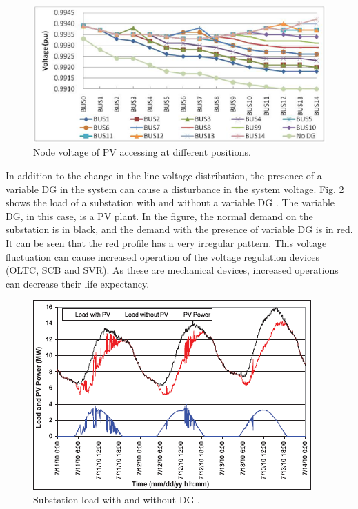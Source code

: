\begin{figure}[!h]
\centering
\includegraphics[width=0.85\linewidth]{figs/VR2.png}
\caption[Node voltage of PV accessing at different positions]{Node voltage of PV accessing at different positions.\cite{VR1}}
\label{fig:VR2}
\end{figure}

In addition to the change in the line voltage distribution, the presence of a variable DG in the system can cause a disturbance in the system voltage. Fig. \ref{fig:VR3} shows the load of a substation with and without a variable DG \cite{GKA11}. The variable DG, in this case, is a PV plant. In the figure, the normal demand on the substation is in black, and the demand with the presence of variable DG is in red. It can be seen that the red profile has a very irregular pattern. This voltage fluctuation can cause increased operation of the voltage regulation devices (OLTC, SCB and SVR). As these are mechanical devices, increased operations can decrease their life expectancy.
 
\begin{figure}[!h]
\centering
\includegraphics[width=0.7\linewidth]{figs/VR3.png}
\caption[Substation load with and without DG.]{Substation load with and without DG \cite{GKA11}.}
\label{fig:VR3}
\end{figure}
 

